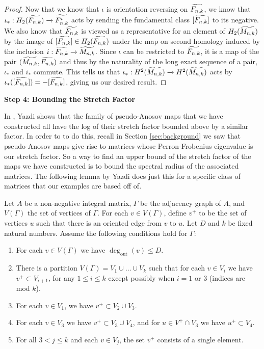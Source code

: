 \begin{proof}
Now that we know that $\iota$ is orientation reversing on $\widetilde{F_{n,k}}$, we know that $\iota_*: H_2(\widetilde{F_{n,k}}) \xrightarrow{} \widetilde{F^i_{n,k}}$ acts by sending the fundamental class $[\widetilde{F_{n,k}}]$ to its negative. We also know that $\widetilde{F_{n,k}}$ is viewed as a representative for an element of $H_2(\widetilde{M_{n,k}})$ by the image of $[\widetilde{F_{n,k}}] \in H_2(\widetilde{F_{n,k}})$ under the map on second homology induced by the inclusion $i: \widetilde{F_{n,k}} \xrightarrow[]{} \widetilde{M_{n,k}}$. Since $\iota$ can be restricted to $\widetilde{F_{n,k}}$, it is a map of the pair $(\widetilde{M_{n,k}},\widetilde{F_{n,k}})$ and thus by the naturality of the long exact sequence of a pair, $\iota_*$ and $i_*$ commute. This tells us that $\iota_*: H^2(\widetilde{M_{n,k}}) \xrightarrow[]{} H^2(\widetilde{M_{n,k}})$ acts by $\iota_*([\widetilde{F_{n,k}}]) = -[\widetilde{F_{n,k}}]$, giving us our desired result.
\end{proof}

\begin{center}
\textbf{Step 4: Bounding the Stretch Factor}
\end{center}

In \cite{yazdi2018pseudo}, Yazdi shows that the family of pseudo-Anosov maps that we have constructed all have the log of their stretch factor bounded above by a similar factor. In order to to do this, recall in Section \ref{sec:background} we saw that pseudo-Anosov maps give rise to matrices whose Perron-Frobenius eigenvalue is our stretch factor. So a way to find an upper bound of the stretch factor of the maps we have constructed is to bound the spectral radius of the associated matrices. The following lemma by Yazdi does just this for a specific class of matrices that our examples are based off of.

\begin{lem}[Yazdi]
\label{lem:spectral}
Let $A$ be a non-negative integral matrix, $\Gamma$ be the adjacency graph of $A$, and $V(\Gamma)$ the set of vertices of $\Gamma$. For each $v \in V(\Gamma)$, define $v^+$ to be the set of vertices $u$ such that there is an oriented edge from $v$ to $u$. Let $D$ and $k$ be fixed natural numbers. Assume the following conditions hold for $\Gamma$: \begin{enumerate}
    \item For each $v \in V(\Gamma)$ we have $\deg_{\text{out}}(v) \leq D$.
    \item There is a partition $V(\Gamma) = V_1 \cup \dots \cup V_k$ such that for each $v \in V_i$ we have $v^+ \subset V_{i+1}$, for any $1 \leq i \leq k$ except possibly when $i = 1$ or 3 (indices are mod $k$).
    \item For each $v \in V_1$, we have $v^+ \subset V_2 \cup V_3$.
    \item For each $v \in V_3$ we have $v^+ \subset V_3 \cup V_4$, and for $u \in V^+ \cap V_3$ we have $u^+ \subset V_4$.
    \item For all $3 < j \leq k$ and each $v \in V_j$, the set $v^+$ consists of a single element.
\end{enumerate}
\end{lem}

